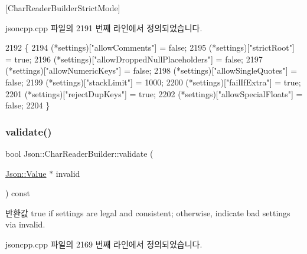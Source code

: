 \mbox{[}Char\+Reader\+Builder\+Strict\+Mode\mbox{]} 

jsoncpp.\+cpp 파일의 2191 번째 라인에서 정의되었습니다.


\begin{DoxyCode}
2192 \{
2194   (*settings)[\textcolor{stringliteral}{"allowComments"}] = \textcolor{keyword}{false};
2195   (*settings)[\textcolor{stringliteral}{"strictRoot"}] = \textcolor{keyword}{true};
2196   (*settings)[\textcolor{stringliteral}{"allowDroppedNullPlaceholders"}] = \textcolor{keyword}{false};
2197   (*settings)[\textcolor{stringliteral}{"allowNumericKeys"}] = \textcolor{keyword}{false};
2198   (*settings)[\textcolor{stringliteral}{"allowSingleQuotes"}] = \textcolor{keyword}{false};
2199   (*settings)[\textcolor{stringliteral}{"stackLimit"}] = 1000;
2200   (*settings)[\textcolor{stringliteral}{"failIfExtra"}] = \textcolor{keyword}{true};
2201   (*settings)[\textcolor{stringliteral}{"rejectDupKeys"}] = \textcolor{keyword}{true};
2202   (*settings)[\textcolor{stringliteral}{"allowSpecialFloats"}] = \textcolor{keyword}{false};
2204 \}
\end{DoxyCode}
\mbox{\label{class_json_1_1_char_reader_builder_af890b5cb70e9b372e41de5c9e6535d21}} 
\subsubsection{\texorpdfstring{validate()}{validate()}}
{\footnotesize\ttfamily bool Json\+::\+Char\+Reader\+Builder\+::validate (\begin{DoxyParamCaption}\item[{\hyperlink{class_json_1_1_value}{Json\+::\+Value} $\ast$}]{invalid }\end{DoxyParamCaption}) const}

\begin{DoxyReturn}{반환값}
true if \textquotesingle{}settings\textquotesingle{} are legal and consistent; otherwise, indicate bad settings via \textquotesingle{}invalid\textquotesingle{}. 
\end{DoxyReturn}


jsoncpp.\+cpp 파일의 2169 번째 라인에서 정의되었습니다.


